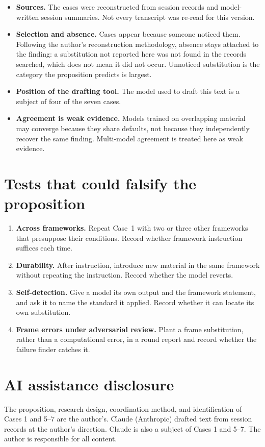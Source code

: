 \documentclass[11pt]{article}
\begin{document}
\begin{itemize}
\item \textbf{Sources.} The cases were reconstructed from session records
and model-written session summaries. Not every transcript was re-read for
this version.
\item \textbf{Selection and absence.} Cases appear because someone noticed
them. Following the author's reconstruction methodology, absence stays
attached to the finding: a substitution not reported here was not found in
the records searched, which does not mean it did not occur. Unnoticed
substitution is the category the proposition predicts is largest.
\item \textbf{Position of the drafting tool.} The model used to draft this
text is a subject of four of the seven cases.
\item \textbf{Agreement is weak evidence.} Models trained on overlapping
material may converge because they share defaults, not because they
independently recover the same finding. Multi-model agreement is treated
here as weak evidence.
\end{itemize}

\section{Tests that could falsify the proposition}

\begin{enumerate}
\item \textbf{Across frameworks.} Repeat Case~1 with two or three other
frameworks that presuppose their conditions. Record whether framework
instruction suffices each time.
\item \textbf{Durability.} After instruction, introduce new material in the
same framework without repeating the instruction. Record whether the model
reverts.
\item \textbf{Self-detection.} Give a model its own output and the
framework statement, and ask it to name the standard it applied. Record
whether it can locate its own substitution.
\item \textbf{Frame errors under adversarial review.} Plant a frame
substitution, rather than a computational error, in a round report and
record whether the failure finder catches it.
\end{enumerate}

\section*{AI assistance disclosure}
The proposition, research design, coordination method, and identification
of Cases 1 and 5--7 are the author's. Claude (Anthropic) drafted text from
session records at the author's direction. Claude is also a subject of
Cases 1 and 5--7. The author is responsible for all content.
\end{document}
